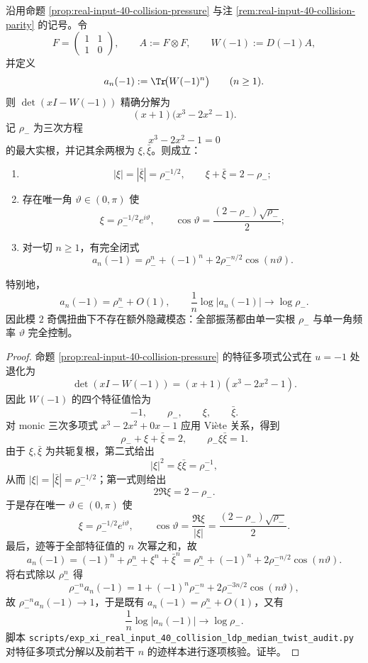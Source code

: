 \begin{theorem}\label{thm:xi-real-input-40-collision-mod2-trace-three-spectrum}
沿用命题 \ref{prop:real-input-40-collision-pressure} 与注 \ref{rem:real-input-40-collision-parity} 的记号。令
\[
F=\begin{pmatrix}1&1\\ 1&0\end{pmatrix},
\qquad
A:=F\otimes F,
\qquad
W(-1):=D(-1)A,
\]
并定义
\[
a_n(-1):=\Tr\!\bigl(W(-1)^n\bigr)\qquad(n\ge 1).
\]
则 \(\det(xI-W(-1))\) 精确分解为
\[
(x+1)\bigl(x^3-2x^2-1\bigr).
\]
记 \(\rho_-\) 为三次方程
\[
x^3-2x^2-1=0
\]
的最大实根，并记其余两根为 \(\xi,\bar\xi\)。则成立：
\begin{enumerate}
  \item
  \[
  |\xi|=|\bar\xi|=\rho_-^{-1/2},
  \qquad
  \xi+\bar\xi=2-\rho_-;
  \]
  \item 存在唯一角 \(\vartheta\in(0,\pi)\) 使
  \[
  \xi=\rho_-^{-1/2}e^{i\vartheta},
  \qquad
  \cos\vartheta=\frac{(2-\rho_-)\sqrt{\rho_-}}{2};
  \]
  \item 对一切 \(n\ge 1\)，有完全闭式
  \[
  \boxed{\;
  a_n(-1)
  =
  \rho_-^n+(-1)^n+2\rho_-^{-n/2}\cos(n\vartheta).\;}
  \]
\end{enumerate}
特别地，
\[
a_n(-1)=\rho_-^n+O(1),
\qquad
\frac1n\log|a_n(-1)|\to \log\rho_-.
\]
因此模 \(2\) 奇偶扭曲下不存在额外隐藏模态：全部振荡都由单一实根 \(\rho_-\) 与单一角频率 \(\vartheta\) 完全控制。
\end{theorem}
\begin{proof}
命题 \ref{prop:real-input-40-collision-pressure} 的特征多项式公式在 \(u=-1\) 处退化为
\[
\det(xI-W(-1))=(x+1)(x^3-2x^2-1).
\]
因此 \(W(-1)\) 的四个特征值恰为
\[
-1,\qquad \rho_-,\qquad \xi,\qquad \bar\xi.
\]
对 monic 三次多项式 \(x^3-2x^2+0x-1\) 应用 Vi\`ete 关系，得到
\[
\rho_-+\xi+\bar\xi=2,
\qquad
\rho_-\xi\bar\xi=1.
\]
由于 \(\xi,\bar\xi\) 为共轭复根，第二式给出
\[
|\xi|^2=\xi\bar\xi=\rho_-^{-1},
\]
从而 \(|\xi|=|\bar\xi|=\rho_-^{-1/2}\)；第一式则给出
\[
2\Re\xi=2-\rho_-.
\]
于是存在唯一 \(\vartheta\in(0,\pi)\) 使
\[
\xi=\rho_-^{-1/2}e^{i\vartheta},
\qquad
\cos\vartheta=\frac{\Re\xi}{|\xi|}
=
\frac{(2-\rho_-)\sqrt{\rho_-}}{2}.
\]
最后，迹等于全部特征值的 \(n\) 次幂之和，故
\[
a_n(-1)
=
(-1)^n+\rho_-^n+\xi^n+\bar\xi^n
=
\rho_-^n+(-1)^n+2\rho_-^{-n/2}\cos(n\vartheta).
\]
将右式除以 \(\rho_-^n\) 得
\[
\rho_-^{-n}a_n(-1)
=
1+(-1)^n\rho_-^{-n}+2\rho_-^{-3n/2}\cos(n\vartheta),
\]
故 \(\rho_-^{-n}a_n(-1)\to1\)，于是既有 \(a_n(-1)=\rho_-^n+O(1)\)，又有
\[
\frac1n\log|a_n(-1)|\to\log\rho_-.
\]
脚本 \texttt{scripts/exp\_xi\_real\_input\_40\_collision\_ldp\_median\_twist\_audit.py} 对特征多项式分解以及前若干 \(n\) 的迹样本进行逐项核验。证毕。
\end{proof}


